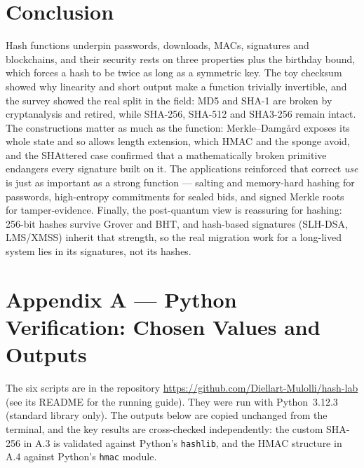 \documentclass[11pt,a4paper]{article}
\begin{document}
\section*{Conclusion}
Hash functions underpin passwords, downloads, MACs, signatures and blockchains, and their security rests
on three properties plus the birthday bound, which forces a hash to be twice as long as a symmetric key.
The toy checksum showed why linearity and short output make a function trivially invertible, and the
survey showed the real split in the field: MD5 and SHA-1 are broken by cryptanalysis and retired, while
SHA-256, SHA-512 and SHA3-256 remain intact. The constructions matter as much as the function:
Merkle--Damg\aa rd exposes its whole state and so allows length extension, which HMAC and the sponge
avoid, and the SHAttered case confirmed that a mathematically broken primitive endangers every signature
built on it. The applications reinforced that correct \emph{use} is just as important as a strong
function --- salting and memory-hard hashing for passwords, high-entropy commitments for sealed bids, and
signed Merkle roots for tamper-evidence. Finally, the post-quantum view is reassuring for hashing:
256-bit hashes survive Grover and BHT, and hash-based signatures (SLH-DSA, LMS/XMSS) inherit that
strength, so the real migration work for a long-lived system lies in its signatures, not its hashes.

\clearpage
\section*{Appendix A --- Python Verification: Chosen Values and Outputs}
The six scripts are in the repository \url{https://github.com/Diellart-Mulolli/hash-lab} (see its README
for the running guide). They were run with Python~3.12.3 (standard library only). The outputs below are
copied unchanged from the terminal, and the key results are cross-checked independently: the custom
SHA-256 in A.3 is validated against Python's \texttt{hashlib}, and the HMAC structure in A.4 against
Python's \texttt{hmac} module.
\end{document}
